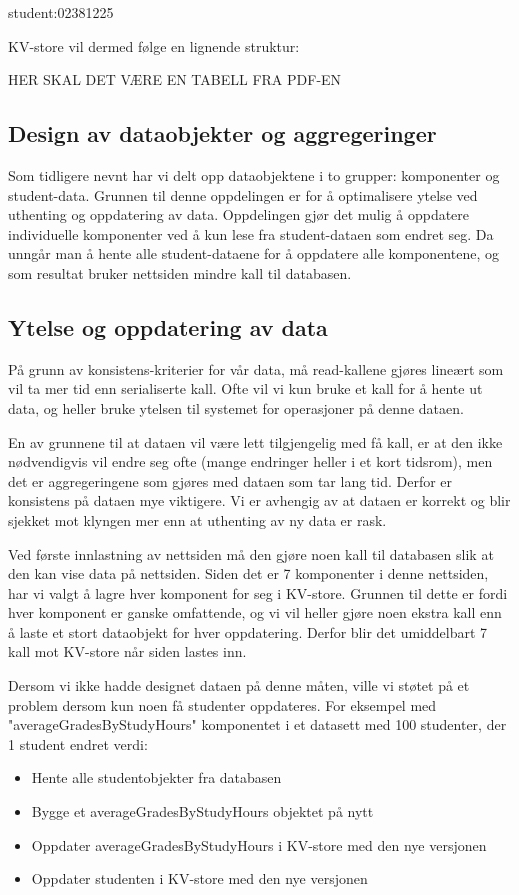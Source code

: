   student:02381225

KV-store vil dermed følge en lignende struktur:

HER SKAL DET VÆRE EN TABELL FRA PDF-EN

\subsection{Design av dataobjekter og aggregeringer}
Som tidligere nevnt har vi delt opp dataobjektene i to grupper: komponenter og student-data. Grunnen til denne oppdelingen er for å optimalisere ytelse ved uthenting og oppdatering av data. Oppdelingen gjør det mulig å oppdatere individuelle komponenter ved å kun lese fra student-dataen som endret seg. Da unngår man å hente alle student-dataene for å oppdatere alle komponentene, og som resultat bruker nettsiden mindre kall til databasen.

\subsection{Ytelse og oppdatering av data}
På grunn av konsistens-kriterier for vår data, må read-kallene gjøres lineært som vil ta mer tid enn serialiserte kall. Ofte vil vi kun bruke et kall for å hente ut data, og heller bruke ytelsen til systemet for operasjoner på denne dataen.

En av grunnene til at dataen vil være lett tilgjengelig med få kall, er at den ikke nødvendigvis vil endre seg ofte (mange endringer heller i et kort tidsrom), men det er aggregeringene som gjøres med dataen som tar lang tid. Derfor er konsistens på dataen mye viktigere. Vi er avhengig av at dataen er korrekt og blir sjekket mot klyngen mer enn at uthenting av ny data er rask.

Ved første innlastning av nettsiden må den gjøre noen kall til databasen slik at den kan vise data på nettsiden. Siden det er 7 komponenter i denne nettsiden, har vi valgt å lagre hver komponent for seg i KV-store. Grunnen til dette er fordi hver komponent er ganske omfattende, og vi vil heller gjøre noen ekstra kall enn å laste et stort dataobjekt for hver oppdatering. Derfor blir det umiddelbart 7 kall mot KV-store når siden lastes inn.

Dersom vi ikke hadde designet dataen på denne måten, ville vi støtet på et problem dersom kun noen få studenter oppdateres. For eksempel med "averageGradesByStudyHours" komponentet i et datasett med 100 studenter, der 1 student endret verdi:

\begin{itemize}
  \item Hente alle studentobjekter fra databasen
  \item Bygge et averageGradesByStudyHours objektet på nytt
  \item Oppdater averageGradesByStudyHours i KV-store med den nye versjonen
  \item Oppdater studenten i KV-store med den nye versjonen
\end{itemize}

